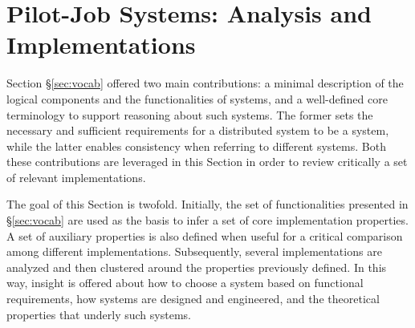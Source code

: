 \documentclass{sig-alternate}
\begin{document}
\section{Pilot-Job Systems: Analysis and Implementations}\label{sec:4}

Section \S\ref{sec:vocab} offered two main contributions: a minimal description
of the logical components and the functionalities of \pilotjob systems, and a
well-defined core terminology to support reasoning about such systems. The
former sets the necessary and sufficient requirements for a distributed system
to be a \pilotjob system, while the latter enables consistency when referring
to different \pilotjob systems. Both these contributions are leveraged in this
Section in order to review critically a set of relevant \pilotjob
implementations.


The goal of this Section is twofold.  Initially, the set of
functionalities presented in \S\ref{sec:vocab} are used as the basis
to infer a set of core implementation properties. A set of auxiliary
properties is also defined when useful for a critical comparison among
different \pilotjob implementations. Subsequently, several \pilotjob
implementations are analyzed and then clustered around the properties
previously defined. In this way, insight is offered about how to
choose a \pilotjob system based on functional requirements, how
\pilotjob systems are designed and engineered, and the theoretical
properties that underly such systems.



\end{document}
